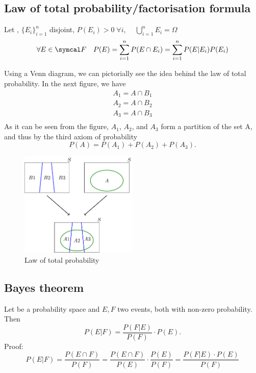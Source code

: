 \subsection{Law of total probability/factorisation formula}
\begin{theorem}
    Let \probspace, $\{E_i\}_{i=1}^n$ disjoint, $P(E_i)>0 \; \forall i$, $\quad \bigcup_{i=1}^nE_i=\Omega$
    \begin{equation*}
        \forall E \in \eff \quad P(E) = \sum_{i=1}^n P(E \cap E_i) = \sum_{i=1}^n P(E|E_i)P(E_i)
    \end{equation*}
\end{theorem}
Using a Venn diagram, we can pictorially see the idea behind the law of total probability. In the next figure, we have
\begin{equation*}
    \begin{gathered}
    A_1 = A \cap B_1\\
    A_2 = A \cap B_2\\
    A_3 = A \cap B_3\\
    \end{gathered}
\end{equation*}
As it can be seen from the figure, $A_1$, $A_2$, and $A_3$ form a partition of the set A, and thus by the third axiom of probability
\begin{equation*}
    P(A)=P(A_1)+P(A_2)+P(A_3).
\end{equation*}
\begin{figure}[ht]
    \centering
    \includegraphics[width=0.5\textwidth]{images/total.png}
    \caption*{Law of total probability}
\end{figure}
\subsection{Bayes theorem}
\begin{theorem}
Let \probspace{} be a probability space and $E, F$ two events, both with non-zero probability. Then
\begin{equation*}
    P(E|F)=\frac{P(F|E)}{P(F)} \cdot P(E).
\end{equation*}
Proof:
\begin{equation*}
    P(E|F)=\frac{P(E \cap F)}{P(F)}=\frac{P(E \cap F)}{P(E)}\cdot\frac{P(E)}{P(F)}=\frac{P(F|E)\cdot P(E)}{P(F)}
\end{equation*}
\end{theorem}
